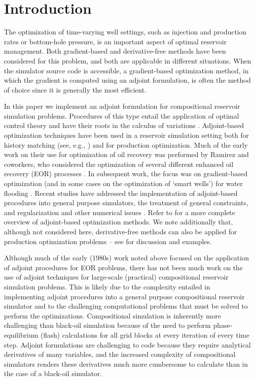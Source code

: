\chapter*{Introduction}
   The optimization of time-varying well settings,
  such as injection and production rates or bottom-hole pressure, is an
  important aspect of optimal reservoir management. Both gradient-based and
  derivative-free methods have been considered for this problem, and both are
  applicable in different situations. When the simulator source code is
  accessible, a gradient-based optimization method, in which the gradient is
  computed using an adjoint formulation, is often the method of choice since it
  is generally the most efficient.

In this paper we implement an adjoint formulation for compositional reservoir
simulation problems. Procedures of this type entail the application of optimal
control theory and have their roots in the calculus of variations
\citep{Bryson:1975,Stengel:1986}. Adjoint-based optimization techniques have been
used in a reservoir simulation setting both for history matching (see, e.g.,
  \citep{Gavalas,Chavent,Li,Oliver,Pallav:2006}) and for production optimization.
Much of the early work on their use for optimization of oil recovery was performed by
Ramirez and coworkers, who considered the optimization of several different
enhanced oil recovery (EOR) processes
\citep{Ramirez:book,Ramirez:1989,Ramirez:1993}. In subsequent work, the focus was
on gradient-based optimization (and in some cases on the optimization of `smart
  wells') for water flooding
\citep{Asheim,Virnovski,Sudaryanto:2000,Brouwer:2004,Pallav:2006}. Recent studies
have addressed the implementation of adjoint-based procedures into general
purpose simulators, the treatment of general constraints, and regularization and
other numerical issues \citep{Pallav:2008,Brouwer:2008,Doublet:2009,CPRA}. Refer
to \citep{Jansen:2011} for a more complete overview of adjoint-based optimization
methods. We note additionally that, although not considered here, derivative-free
methods can also be applied for production optimization problems -- see
\citep{echeverria:2011} for discussion and examples.

Although much of the early (1980s) work noted above focused on the application
of adjoint procedures for EOR problems, there has not been much work on the use
of adjoint techniques for large-scale (practical) compositional reservoir
simulation problems. This is likely due to the complexity entailed in
implementing adjoint procedures into a general purpose compositional reservoir
simulator and to the challenging computational problems that must be solved to
perform the optimizations. Compositional simulation is inherently more
challenging than black-oil simulation because of the need to perform
phase-equilibrium (flash) calculations for all grid blocks at every iteration of every time step. Adjoint formulations are challenging to code
because they require analytical derivatives of many variables, and the
increased complexity of compositional simulators renders these derivatives
much more cumbersome to calculate than in the case of a black-oil simulator.


